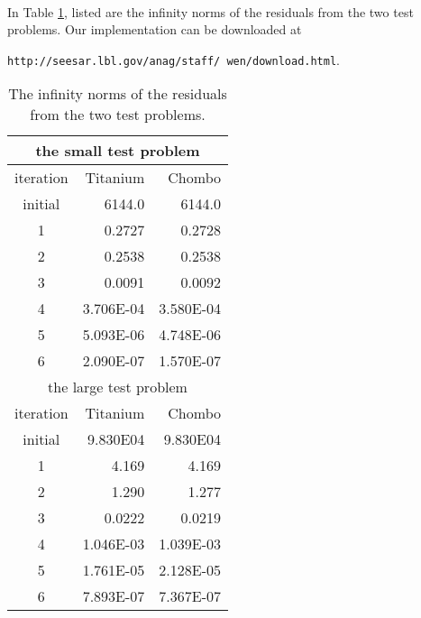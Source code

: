 \documentclass{ieee}
\numberwithin{equation}{section}
\begin{document}
\paragraph{}In Table \ref{appendixA}, listed are the infinity norms of the residuals from the two test problems. Our implementation can be downloaded at\\ 
\begin{center}
{\small \tt http://seesar.lbl.gov/anag/staff/
wen/download.html}.
\end{center}
\begin{table}
\begin{center}
{\small
\begin{tabular}{|c|r|r|}\hline
\multicolumn{3}{|c|}{the small test problem} \\ \hline
iteration &Titanium  &Chombo   \\ \hline
  initial &6144.0    &6144.0    \\ \hline
        1 &0.2727    &0.2728     \\ \hline
        2 &0.2538    &0.2538      \\ \hline
        3 &0.0091    &0.0092      \\ \hline
        4 &3.706E-04 &3.580E-04   \\ \hline
        5 &5.093E-06 &4.748E-06    \\ \hline
	6 &2.090E-07 &1.570E-07    \\ \hline\hline
\multicolumn{3}{|c|}{the large test problem} \\ \hline
iteration &Titanium  &Chombo\\ \hline
  initial &9.830E04  &9.830E04\\ \hline
        1 &4.169    &4.169\\ \hline
        2 &1.290    &1.277\\ \hline
        3 &0.0222    &0.0219\\ \hline
        4 &1.046E-03 &1.039E-03\\ \hline
        5 &1.761E-05 &2.128E-05\\ \hline
	6 &7.893E-07 &7.367E-07\\ \hline
\end{tabular}
}
\caption{The infinity norms of the residuals from the two test problems.}\label{appendixA}
\end{center}
\end{table}




\end{document}
